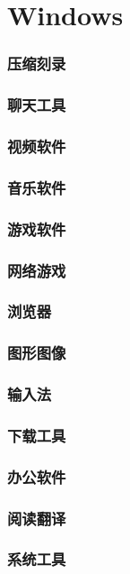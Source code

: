 \part{Windows}
\setcounter{section}{0}
\clearpage
\section{压缩刻录}


\section{聊天工具}
\section{视频软件}
\section{音乐软件}
\section{游戏软件}
\section{网络游戏}
\section{浏览器}
\section{图形图像}
\section{输入法}
\section{下载工具}
\section{办公软件}
\section{阅读翻译}
\clearpage
\section{系统工具}

